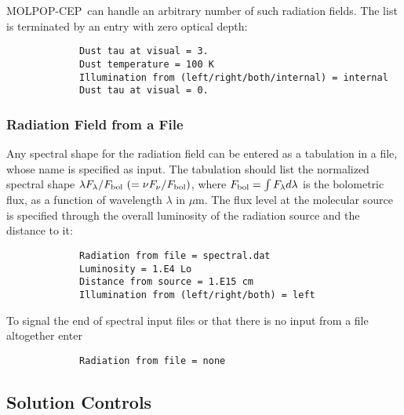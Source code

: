 \documentclass[12pt]{article}
\def\separation {0.5cm}
\def\mic      {\hbox{$\mu$m}}
\def\M{MOLPOP-CEP}
\begin{document}
\M\ can handle an arbitrary number of such radiation fields. The list is
terminated by an entry with zero optical depth:

\vspace{\separation}
\begin{verbatim}
             Dust tau at visual = 3.
             Dust temperature = 100 K
             Illumination from (left/right/both/internal) = internal
             Dust tau at visual = 0.
\end{verbatim}

\subsubsection{Radiation Field from a File}

Any spectral shape for the radiation field can be entered as a tabulation in a
file, whose name is specified as input. The tabulation should list the
normalized spectral shape $\lambda F_\lambda/F_{\rm bol}\ (= \nu F_\nu/F_{\rm
bol})$, where $F_{\rm bol} = \int F_\lambda d\lambda$ is the bolometric flux,
as a function of wavelength $\lambda$ in \mic. The flux level at the molecular
source is specified through the overall luminosity of the radiation source and
the distance to it:

\vspace{\separation}
\begin{verbatim}
             Radiation from file = spectral.dat
             Luminosity = 1.E4 Lo
             Distance from source = 1.E15 cm
             Illumination from (left/right/both) = left
\end{verbatim}
To signal the end of spectral input files or that there is no input from a file
altogether enter
\begin{verbatim}
             Radiation from file = none
\end{verbatim}

\subsection{Solution Controls}
\end{document}
